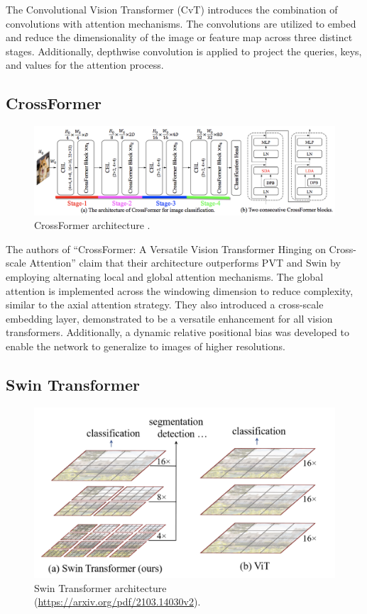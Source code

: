 The Convolutional Vision Transformer (CvT) introduces the combination of convolutions with attention mechanisms. The convolutions are utilized to embed and reduce the dimensionality of the image or feature map across three distinct stages. Additionally, depthwise convolution is applied to project the queries, keys, and values for the attention process.

\subsection*{CrossFormer}

\begin{figure}[htbp]
    \centering
    \includegraphics[width=0.8\linewidth]{obrazky-figures/02-theoretical-basis/crossformer.png}
    \caption{CrossFormer architecture \cite{wang2021crossformerversatilevisiontransformer}.}
    \label{fig:crossformer}
\end{figure}

The authors of \enquote{CrossFormer: A Versatile Vision Transformer Hinging on Cross-scale Attention} \cite{wang2021crossformerversatilevisiontransformer} claim that their architecture outperforms PVT and Swin by employing alternating local and global attention mechanisms. The global attention is implemented across the windowing dimension to reduce complexity, similar to the axial attention strategy. They also introduced a cross-scale embedding layer, demonstrated to be a versatile enhancement for all vision transformers. Additionally, a dynamic relative positional bias was developed to enable the network to generalize to images of higher resolutions.

\subsection*{Swin Transformer}

\begin{figure}[htbp]
    \centering
    \includegraphics[width=0.5\linewidth]{obrazky-figures/02-theoretical-basis/swin.png}
    \caption{Swin Transformer architecture (\url{https://arxiv.org/pdf/2103.14030v2}).}
    \label{fig:swin}
\end{figure}

